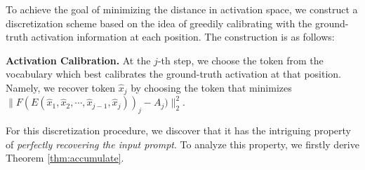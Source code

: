 


To achieve the goal of minimizing the distance in activation space, we construct a discretization scheme based on the idea of greedily calibrating with the ground-truth activation information at each position. The construction is as follows:


\noindent \textbf{ Activation Calibration.}  At the $j$-th step, we choose the token from the vocabulary which best calibrates the ground-truth activation at that position. Namely, we recover token $\hat{x}_j$ by choosing the token that minimizes $\| F(E(\hat{x}_1,\hat{x}_2,\cdots,\hat{x}_{j-1},\hat{x}_j))_j-A_j) \|_2^2$.  


For this discretization procedure, we discover that it has the intriguing property of \emph{perfectly recovering the input prompt}.   To analyze this property, we firstly derive Theorem \ref{thm:accumulate}.



